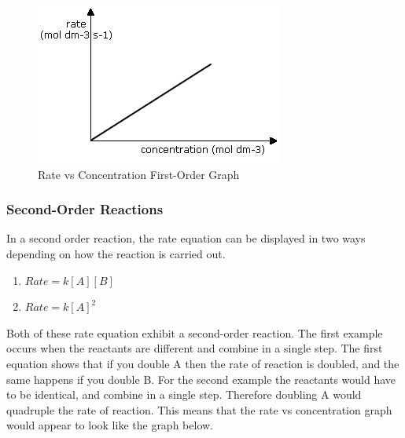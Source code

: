 \begin{figure}[H]
    \includegraphics[width=\textwidth]{./Planning/Images/FirstOrder.jpg}
    \caption{ Rate vs Concentration First-Order Graph} \label{fig:First Order Graph}
\end{figure}

\subsubsection{Second-Order Reactions}

In a second order reaction, the rate equation can be displayed in two ways depending on how the reaction is carried out.

\begin{enumerate}
\item $Rate = k[A] [B]$
\item $Rate = k[A]^2$
\end{enumerate}

Both of these rate equation exhibit a second-order reaction. The first example occurs when the reactants are different and combine in a single step. The first equation shows that if you double A then the rate of reaction is doubled, and the same happens if you double B. For the second example the reactants would have to be identical, and combine in a single step. Therefore doubling A would quadruple the rate of reaction. This means that the rate vs concentration graph would appear to look like the graph below.

